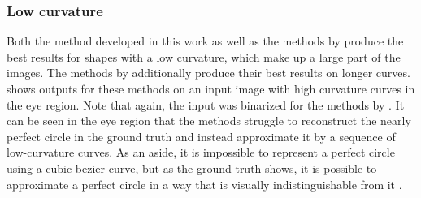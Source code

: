 \clearpage
\subsubsection{Low curvature}
\label{subsec:low.curvature}

Both the method developed in this work as well as the methods by \citet{autotrace,Puhachov2021KeypointPolyvector} produce the best results for shapes with a low curvature, which make up a large part of the images. The methods by \citet{autotrace,Puhachov2021KeypointPolyvector} additionally produce their best results on longer curves.  shows outputs for these methods on an input image with high curvature curves in the eye region. Note that again, the input was binarized for the methods by \citet{autotrace,Puhachov2021KeypointPolyvector}. It can be seen in the eye region that the methods struggle to reconstruct the nearly perfect circle in the ground truth and instead approximate it by a sequence of low-curvature curves. As an aside, it is impossible to represent a perfect circle using a cubic bezier curve, but as the ground truth shows, it is possible to approximate a perfect circle in a way that is visually indistinguishable from it \citep{DOKKEN199033}.

